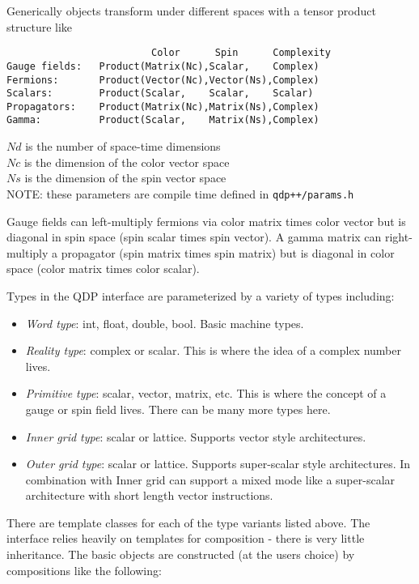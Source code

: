 \documentclass[12pt,letterpaper]{article}
\begin{document}
Generically objects transform under different spaces with a tensor
product structure like

\begin{verbatim}
                         Color      Spin      Complexity
Gauge fields:   Product(Matrix(Nc),Scalar,    Complex)
Fermions:       Product(Vector(Nc),Vector(Ns),Complex)
Scalars:        Product(Scalar,    Scalar,    Scalar)
Propagators:    Product(Matrix(Nc),Matrix(Ns),Complex)
Gamma:          Product(Scalar,    Matrix(Ns),Complex)
\end{verbatim}

\noindent
$Nd$ is the number of space-time dimensions\\
\noindent
$Nc$ is the dimension of the color vector space\\
\noindent
$Ns$ is the dimension of the spin vector space\\
\noindent
NOTE: these parameters are compile time defined in  {\tt qdp++/params.h}

Gauge fields can left-multiply fermions via color matrix times color
vector but is diagonal in spin space (spin scalar times spin vector).
A gamma matrix can right-multiply a propagator (spin matrix times
spin matrix) but is diagonal in color space (color matrix times color
scalar).

Types in the QDP interface are parameterized by a variety of types including:
\begin{itemize}
\item {\em Word type}: 
  int, float, double, bool. Basic machine types.
\item {\em Reality type}: 
  complex or scalar. This is where the idea of a complex number
  lives.
\item {\em Primitive type}: 
  scalar, vector, matrix, etc. This is where the concept of a gauge or
  spin field lives. There can be many more types here.
\item {\em Inner grid type}: 
  scalar or lattice. Supports vector style architectures.
\item {\em Outer grid type}:
  scalar or lattice. Supports super-scalar style architectures. In
  combination with Inner grid can support a mixed mode like a
  super-scalar architecture with short length vector instructions.
\end{itemize}

There are template classes for each of the type variants listed
above. The interface relies heavily on templates for
composition - there is very little inheritance. The basic objects are
constructed (at the users choice) by compositions like the following:
\end{document}
